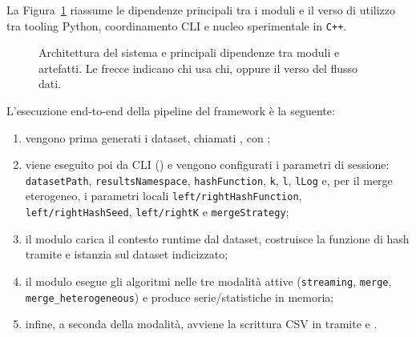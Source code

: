 La Figura~\ref{fig:system-architecture} riassume le dipendenze principali tra i moduli
e il verso di utilizzo tra tooling Python, coordinamento CLI e nucleo sperimentale in \texttt{C++}.

\clearpage
\begin{landscape}
    \begin{figure}[p]
        \centering
        \resizebox{0.98\linewidth}{!}{}
        \caption{Architettura del sistema e principali dipendenze tra moduli e artefatti. Le frecce indicano chi usa chi, oppure il verso del flusso dati.}
        \label{fig:system-architecture}
    \end{figure}
\end{landscape}
\clearpage

L'esecuzione end-to-end della pipeline del framework è la seguente:
\begin{enumerate}
    \item vengono prima generati i dataset, chiamati , con
    ;
    \item viene eseguito poi da CLI () e vengono configurati i parametri
    di sessione: \texttt{datasetPath}, \texttt{resultsNamespace},
    \texttt{hashFunction}, \texttt{k}, \texttt{l}, \texttt{lLog} e, per il
    merge eterogeneo, i parametri locali \texttt{left/rightHashFunction},
    \texttt{left/rightHashSeed}, \texttt{left/rightK} e
    \texttt{mergeStrategy};
    \item il modulo  carica il contesto runtime dal dataset, costruisce
    la funzione di hash tramite  e istanzia
     sul dataset indicizzato;
    \item il modulo  esegue gli algoritmi nelle tre modalità attive
    (\texttt{streaming}, \texttt{merge}, \texttt{merge\_heterogeneous}) e produce serie/statistiche in memoria;
    \item infine, a seconda della modalità, avviene la scrittura CSV in
    tramite  e .
\end{enumerate}

